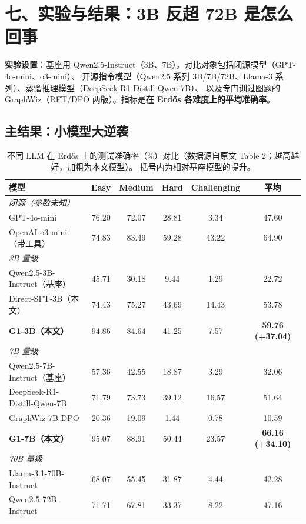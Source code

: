 \documentclass[11pt,UTF8,fontset=fandol]{ctexart}
\begin{document}
\section{七、实验与结果：3B 反超 72B 是怎么回事}

\textbf{实验设置}：基座用 Qwen2.5-Instruct（3B、7B）。对比对象包括闭源模型（GPT-4o-mini、o3-mini）、
开源指令模型（Qwen2.5 系列 3B/7B/72B、Llama-3 系列）、蒸馏推理模型（DeepSeek-R1-Distill-Qwen-7B）、
以及专门训过图题的 GraphWiz（RFT/DPO 两版）。指标是\textbf{在 Erdős 各难度上的平均准确率}。

\subsection{主结果：小模型大逆袭}

\begin{table}[H]\centering
\caption{不同 LLM 在 Erdős 上的测试准确率（\%）对比（数据源自原文 Table 2；越高越好，加粗为本文模型）。
括号内为相对基座模型的提升。}
\begin{tabular}{lccccc}
\toprule
\textbf{模型} & \textbf{Easy} & \textbf{Medium} & \textbf{Hard} & \textbf{Challenging} & \textbf{平均} \\
\midrule
\multicolumn{6}{l}{\textit{闭源（参数未知）}} \\
GPT-4o-mini                 & 76.20 & 72.07 & 28.81 & \phantom{0}3.34 & 47.60 \\
OpenAI o3-mini（带工具）      & 74.83 & 83.49 & 59.28 & 43.22 & 64.90 \\
\midrule
\multicolumn{6}{l}{\textit{3B 量级}} \\
Qwen2.5-3B-Instruct（基座）  & 45.71 & 30.18 & \phantom{0}9.44 & \phantom{0}1.29 & 22.72 \\
Direct-SFT-3B（本文）        & 74.43 & 75.27 & 43.69 & 14.43 & 53.78 \\
\textbf{G1-3B（本文）}       & 94.86 & 84.64 & 41.25 & \phantom{0}7.57 & \textbf{59.76 (+37.04)} \\
\midrule
\multicolumn{6}{l}{\textit{7B 量级}} \\
Qwen2.5-7B-Instruct（基座）  & 57.36 & 42.55 & 18.87 & \phantom{0}3.29 & 32.06 \\
DeepSeek-R1-Distill-Qwen-7B & 71.79 & 73.73 & 39.12 & 16.57 & 51.64 \\
GraphWiz-7B-DPO             & 20.36 & 19.09 & \phantom{0}1.44 & \phantom{0}0.78 & 10.59 \\
\textbf{G1-7B（本文）}       & 95.07 & 88.91 & 50.44 & 23.57 & \textbf{66.16 (+34.10)} \\
\midrule
\multicolumn{6}{l}{\textit{70B 量级}} \\
Llama-3.1-70B-Instruct      & 68.07 & 55.45 & 31.87 & \phantom{0}4.44 & 42.28 \\
Qwen2.5-72B-Instruct        & 71.71 & 67.81 & 33.37 & \phantom{0}8.22 & 47.16 \\
\bottomrule
\end{tabular}
\end{table}
\end{document}
